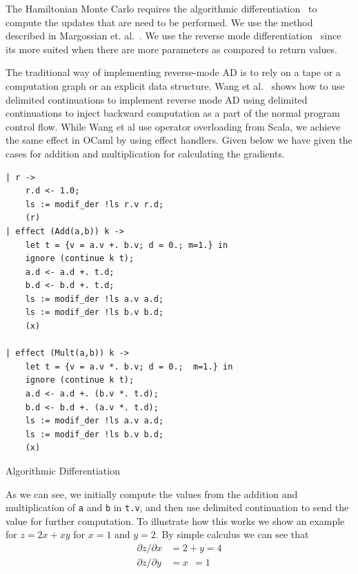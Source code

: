 \documentclass[a4paper,11pt]{article}
\theoremstyle{mytheor}
\begin{document}
    The Hamiltonian Monte Carlo requires the algorithmic differentiation~\cite{adml} to compute the updates that are need to be performed.  We use the method described in Margossian et. al.~\cite{Margossian_2019}. We use the reverse mode differentiation~\cite{reverse} since its more suited when there are more parameters as compared to return values.
    
    The traditional way of implementing reverse-mode AD is to rely on a tape or a computation graph or an explicit data structure. Wang et al.~\cite{wang2019demystifying} shows how to use delimited continuations to implement reverse mode AD using delimited continuations to inject backward computation as a part of the normal program control flow. While Wang et al use operator overloading from Scala, we achieve the same effect in OCaml by using effect handlers. Given below we have given the cases for addition and multiplication for calculating the gradients.
    
\begin{listing}[H]\centering
\begin{verbatim}
| r -> 
	r.d <- 1.0; 
	ls := modif_der !ls r.v r.d;
	(r)
| effect (Add(a,b)) k ->
	let t = {v = a.v +. b.v; d = 0.; m=1.} in
	ignore (continue k t);
	a.d <- a.d +. t.d;
	b.d <- b.d +. t.d; 
	ls := modif_der !ls a.v a.d;
	ls := modif_der !ls b.v b.d;
	(x)
	
| effect (Mult(a,b)) k ->
	let t = {v = a.v *. b.v; d = 0.;  m=1.} in
	ignore (continue k t);
	a.d <- a.d +. (b.v *. t.d);
	b.d <- b.d +. (a.v *. t.d);
	ls := modif_der !ls a.v a.d;
	ls := modif_der !ls b.v b.d;
	(x)
\end{verbatim}
  
\caption{Algorithmic Differentiation}
\end{listing}   
    As we can see, we initially compute the values from the addition and multiplication of \lstinline{a} and \lstinline{b} in \lstinline{t.v}, and then use delimited continuation to send the value for further computation.  To illustrate how this works we show an example for $z = 2x + xy$ for $x=1$ and $y=2$. By simple calculus we can see that
    \begin{align}
        \partial z / \partial x &= 2 + y = 4\\
        \partial z / \partial y &= x ~~= 1
    \end{align}
    
    
    
\end{document}
